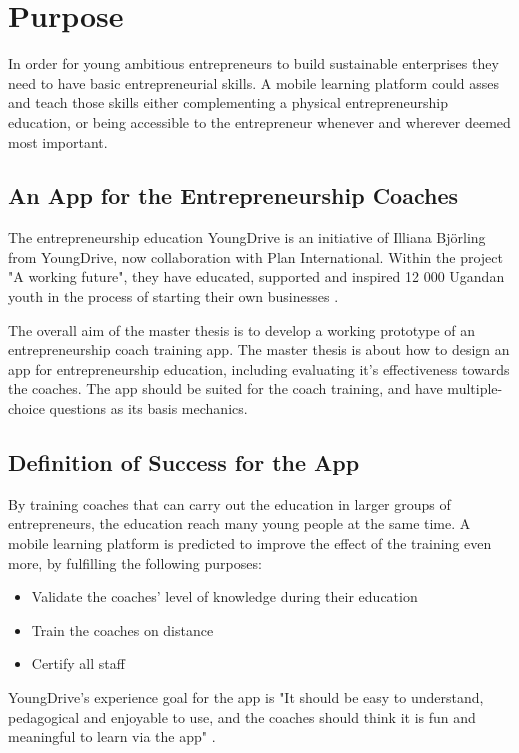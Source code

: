 \section{Purpose}
\label{purpose}

In order for young ambitious entrepreneurs to build sustainable enterprises they need to have basic entrepreneurial skills. A mobile learning platform could asses and teach those skills either complementing a physical entrepreneurship education, or being accessible to the entrepreneur whenever and wherever deemed most important.

\subsection{An App for the Entrepreneurship Coaches}
The entrepreneurship education YoungDrive is an initiative of Illiana Björling from YoungDrive, now collaboration with Plan International. Within the project "A working future", they have educated, supported and inspired 12 000 Ugandan youth in the process of starting their own businesses \citep{nissar}.

The overall aim of the master thesis is to develop a working prototype of an entrepreneurship coach training app. The master thesis is about how to design an app for entrepreneurship education, including evaluating it's effectiveness towards the coaches. The app should be suited for the coach training, and have multiple-choice questions as its basis mechanics.

\subsection{Definition of Success for the App}\label{sec:definitionofsuccess}

By training coaches that can carry out the education in larger groups of entrepreneurs, the education reach many young people at the same time. A mobile learning platform is predicted to improve the effect of the training even more, by fulfilling the following purposes:

\begin{itemize}
  \item Validate the coaches' level of knowledge during their education
    \item Train the coaches on distance
    \item Certify all staff
\end{itemize}

YoungDrive's experience goal for the app is "It should be easy to understand, pedagogical and enjoyable to use, and the coaches should think it is fun and meaningful to learn via the app" \citep{youngdrive-masterthesis-idea}.
